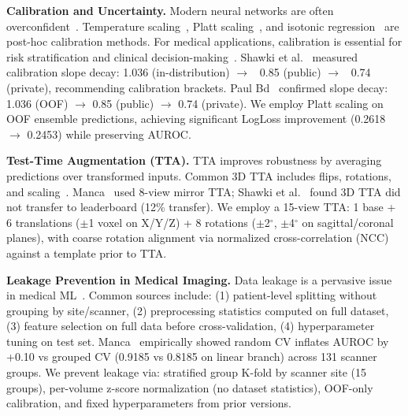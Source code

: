 \noindent\textbf{Calibration and Uncertainty.}
Modern neural networks are often overconfident~\cite{guo2017calibration}. Temperature scaling~\cite{guo2017calibration}, Platt scaling~\cite{platt1999probabilistic}, and isotonic regression~\cite{zadrozny2002transforming} are post-hoc calibration methods. For medical applications, calibration is essential for risk stratification and clinical decision-making~\cite{kull2019beyond}. Shawki et al.~\cite{shawki2024dat} measured calibration slope decay: 1.036 (in-distribution) $\to$ ~0.85 (public) $\to$ ~0.74 (private), recommending calibration brackets. Paul Bd~\cite{paulbd2024dat} confirmed slope decay: 1.036 (OOF) $\to$ 0.85 (public) $\to$ 0.74 (private). We employ Platt scaling on OOF ensemble predictions, achieving significant LogLoss improvement (0.2618 $\to$ 0.2453) while preserving AUROC.

\noindent\textbf{Test-Time Augmentation (TTA).}
TTA improves robustness by averaging predictions over transformed inputs. Common 3D TTA includes flips, rotations, and scaling~\cite{wang2019test}. Manca~\cite{manca2024dat} used 8-view mirror TTA; Shawki et al.~\cite{shawki2024dat} found 3D TTA did not transfer to leaderboard (12\% transfer). We employ a 15-view TTA: 1 base + 6 translations ($\pm$1 voxel on X/Y/Z) + 8 rotations ($\pm$2$^\circ$, $\pm$4$^\circ$ on sagittal/coronal planes), with coarse rotation alignment via normalized cross-correlation (NCC) against a template prior to TTA.

\noindent\textbf{Leakage Prevention in Medical Imaging.}
Data leakage is a pervasive issue in medical ML~\cite{esteban2020leakage,roberts2021common}. Common sources include: (1) patient-level splitting without grouping by site/scanner, (2) preprocessing statistics computed on full dataset, (3) feature selection on full data before cross-validation, (4) hyperparameter tuning on test set. Manca~\cite{manca2024dat} empirically showed random CV inflates AUROC by +0.10 vs grouped CV (0.9185 vs 0.8185 on linear branch) across 131 scanner groups. We prevent leakage via: stratified group K-fold by scanner site (15 groups), per-volume z-score normalization (no dataset statistics), OOF-only calibration, and fixed hyperparameters from prior versions.
